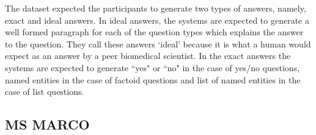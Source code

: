 The dataset expected the participants to generate two types of answers, namely, exact and ideal answers. In ideal answers, the systems are expected to generate a well formed paragraph for each of the question types which explains the answer to the question. They call these answers `ideal' because it is what a human would expect as an answer by a peer biomedical scientist. In the exact answers the systems are expected to generate ``yes" or ``no" in the case of yes/no questions, named entities in the case of factoid questions and list of named entities in the case of list questions.

\subsection{MS MARCO}